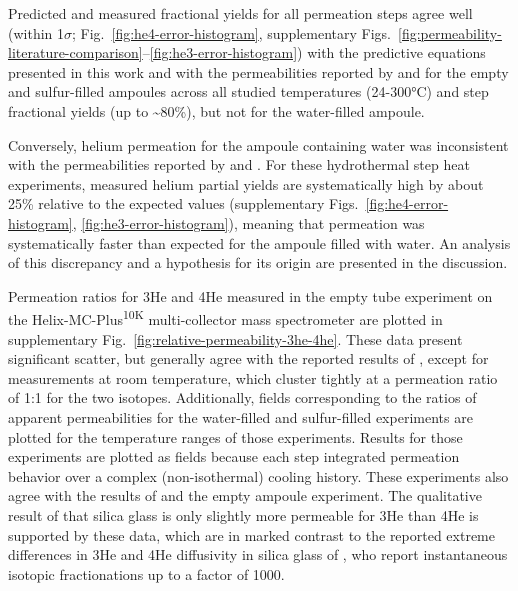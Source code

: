 Predicted and measured fractional yields for all permeation steps agree well (within 1$\sigma$; Fig.~\ref{fig:he4-error-histogram}, supplementary Figs.~\ref{fig:permeability-literature-comparison}--\ref{fig:he3-error-histogram}) with the predictive equations presented in this work and with the permeabilities reported by \citet{swets1961} and \citet{jones1953} for the empty and sulfur-filled ampoules across all studied temperatures (24-300°C) and step fractional yields (up to \textasciitilde80\%), but not for the water-filled ampoule.

Conversely, helium permeation for the ampoule containing water was inconsistent with the permeabilities reported by \citet{swets1961} and \citet{jones1953}. For these hydrothermal step heat experiments, measured helium partial yields are systematically high by about 25\% relative to the expected values (supplementary Figs.~\ref{fig:he4-error-histogram}, \ref{fig:he3-error-histogram}), meaning that permeation was systematically faster than expected for the ampoule filled with water. An analysis of this discrepancy and a hypothesis for its origin are presented in the discussion.

Permeation ratios for 3He and 4He measured in the empty tube experiment on the Helix-MC-Plus\textsuperscript{10K} multi-collector mass spectrometer are plotted in supplementary Fig.~\ref{fig:relative-permeability-3he-4he}. These data present significant scatter, but generally agree with the reported results of \citet{jones1953}, except for measurements at room temperature, which cluster tightly at a permeation ratio of 1:1 for the two isotopes. Additionally, fields corresponding to the ratios of apparent permeabilities for the water-filled and sulfur-filled experiments are plotted for the temperature ranges of those experiments. Results for those experiments are plotted as fields because each step integrated permeation behavior over a complex (non-isothermal) cooling history. These experiments also agree with the results of \citet{jones1953} and the empty ampoule experiment. The qualitative result of \citet{jones1953} that silica glass is only slightly more permeable for 3He than 4He is supported by these data, which are in marked contrast to the reported extreme differences in 3He and 4He diffusivity in silica glass of \citet{mcmurtry2019}, who report instantaneous isotopic fractionations up to a factor of 1000.

